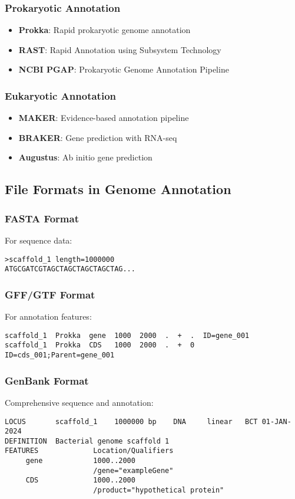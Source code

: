 \subsubsection{Prokaryotic Annotation}
\begin{itemize}
    \item \textbf{Prokka}: Rapid prokaryotic genome annotation
    \item \textbf{RAST}: Rapid Annotation using Subsystem Technology
    \item \textbf{NCBI PGAP}: Prokaryotic Genome Annotation Pipeline
\end{itemize}

\subsubsection{Eukaryotic Annotation}
\begin{itemize}
    \item \textbf{MAKER}: Evidence-based annotation pipeline
    \item \textbf{BRAKER}: Gene prediction with RNA-seq
    \item \textbf{Augustus}: Ab initio gene prediction
\end{itemize}

\subsection{File Formats in Genome Annotation}

\subsubsection{FASTA Format}
For sequence data:
\begin{verbatim}
>scaffold_1 length=1000000
ATGCGATCGTAGCTAGCTAGCTAGCTAG...
\end{verbatim}

\subsubsection{GFF/GTF Format}
For annotation features:
\begin{verbatim}
scaffold_1  Prokka  gene  1000  2000  .  +  .  ID=gene_001
scaffold_1  Prokka  CDS   1000  2000  .  +  0  ID=cds_001;Parent=gene_001
\end{verbatim}

\subsubsection{GenBank Format}
Comprehensive sequence and annotation:
\begin{verbatim}
LOCUS       scaffold_1    1000000 bp    DNA     linear   BCT 01-JAN-2024
DEFINITION  Bacterial genome scaffold 1
FEATURES             Location/Qualifiers
     gene            1000..2000
                     /gene="exampleGene"
     CDS             1000..2000
                     /product="hypothetical protein"
\end{verbatim}

